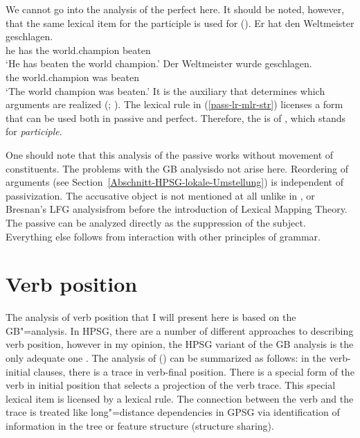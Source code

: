 We cannot go into the analysis of the perfect here. It should be noted, however, that the same lexical
item for the participle is
used for ().
\eal
\ex 
\gll Er hat den Weltmeister geschlagen.\\
	 he has the world.champion beaten\\
\glt `He has beaten the world champion.'
\ex 
\gll Der Weltmeister wurde geschlagen.\\
	 the world.champion was beaten\\
\glt `The world champion was beaten.'
\zl
It is the auxiliary that determines which arguments are realized (\citealp{Haider86}; \citealp[Chapter~17]{MuellerLehrbuch1}).
The lexical rule in (\ref{pass-lr-mlr-str}) licenses a form that can be used both in passive and perfect. Therefore, the
\vformv is of , which stands for \emph{participle}.

One should note that this analysis of the passive works without movement of constituents. The problems with the GB analysis\indexgb do not arise here.
Reordering of arguments (see Section~\ref{Abschnitt-HPSG-lokale-Umstellung}) is independent of passivization. The accusative object is not mentioned
at all unlike in \gpsg, \cg or Bresnan's LFG analysis\indexlfg from before the introduction of
Lexical Mapping Theory. The passive can be analyzed directly as the suppression of the subject. Everything else follows from interaction with other principles of grammar.

\section{Verb position}
\label{Abschnitt-Verbstellung-HPSG}

The analysis of verb position that I will present here is based on the GB"=analysis. In HPSG, there are a number of different approaches
to describing verb position, however in my opinion, the HPSG variant of the GB analysis is the only adequate one \citep{Mueller2005c,Mueller2005d,MuellerGS}.
The analysis of () can be summarized as follows: in the verb-initial clauses, there is a trace in verb-final position. There is a special form of the 
verb in initial position that selects a projection of the verb trace. This special lexical item is licensed by a lexical rule. The connection between the
verb and the trace is treated like long"=distance dependencies in GPSG via identification of information in the tree or feature structure (structure sharing).

